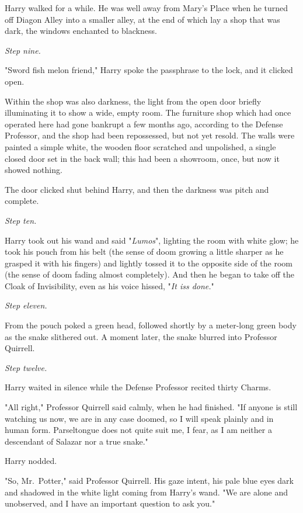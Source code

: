 Harry walked for a while. He was well away from Mary's Place when he turned off 
Diagon Alley into a smaller alley, at the end of which lay a shop that was 
dark, the windows enchanted to blackness.

\emph{Step nine.}

"Sword fish melon friend," Harry spoke the passphrase to the lock, and it 
clicked open.

Within the shop was also darkness, the light from the open door briefly 
illuminating it to show a wide, empty room. The furniture shop which had once 
operated here had gone bankrupt a few months ago, according to the Defense 
Professor, and the shop had been repossessed, but not yet resold. The walls 
were painted a simple white, the wooden floor scratched and unpolished, a 
single closed door set in the back wall; this had been a showroom, once, but 
now it showed nothing.

The door clicked shut behind Harry, and then the darkness was pitch and 
complete.

\emph{Step ten.}

Harry took out his wand and said "\emph{Lumos}", lighting the room with white 
glow; he took his pouch from his belt (the sense of doom growing a little 
sharper as he grasped it with his fingers) and lightly tossed it to the 
opposite side of the room (the sense of doom fading almost completely). And 
then he began to take off the Cloak of Invisibility, even as his voice hissed, 
"\emph{It iss done.}"

\emph{Step eleven.}

From the pouch poked a green head, followed shortly by a meter-long green body 
as the snake slithered out. A moment later, the snake blurred into Professor 
Quirrell.

\emph{Step twelve.}

Harry waited in silence while the Defense Professor recited thirty Charms.

"All right," Professor Quirrell said calmly, when he had finished. "If anyone 
is still watching us now, we are in any case doomed, so I will speak plainly 
and in human form. Parseltongue does not quite suit me, I fear, as I am neither 
a descendant of Salazar nor a true snake."

Harry nodded.

"So, Mr.~Potter," said Professor Quirrell. His gaze intent, his pale blue eyes 
dark and shadowed in the white light coming from Harry's wand. "We are alone 
and unobserved, and I have an important question to ask you."

